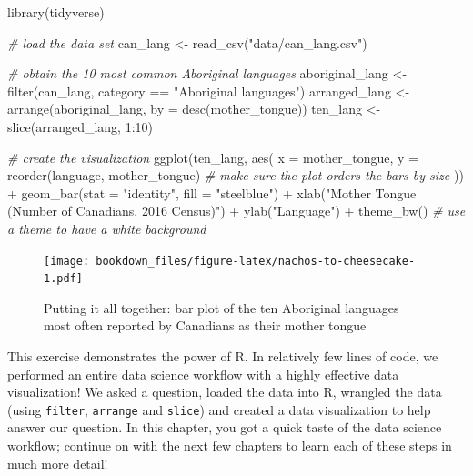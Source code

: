 \documentclass[
]{book}
\newenvironment{Shaded}{\begin{snugshade}}{\end{snugshade}}
\newcommand{\AttributeTok}[1]{\textcolor[rgb]{0.61,0.61,0.61}{#1}}
\newcommand{\CommentTok}[1]{\textcolor[rgb]{0.37,0.37,0.37}{\textit{#1}}}
\newcommand{\DecValTok}[1]{\textcolor[rgb]{0.06,0.06,0.06}{#1}}
\newcommand{\FunctionTok}[1]{\textcolor[rgb]{0,0,0}{#1}}
\newcommand{\NormalTok}[1]{#1}
\newcommand{\OtherTok}[1]{\textcolor[rgb]{0.37,0.37,0.37}{#1}}
\newcommand{\SpecialCharTok}[1]{\textcolor[rgb]{0,0,0}{#1}}
\newcommand{\StringTok}[1]{\textcolor[rgb]{0.5,0.5,0.5}{#1}}
\begin{document}
\begin{Shaded}
\begin{Highlighting}[]
\FunctionTok{library}\NormalTok{(tidyverse)}

\CommentTok{\# load the data set}
\NormalTok{can\_lang }\OtherTok{\textless{}{-}} \FunctionTok{read\_csv}\NormalTok{(}\StringTok{"data/can\_lang.csv"}\NormalTok{)}

\CommentTok{\# obtain the 10 most common Aboriginal languages}
\NormalTok{aboriginal\_lang }\OtherTok{\textless{}{-}} \FunctionTok{filter}\NormalTok{(can\_lang, category }\SpecialCharTok{==} \StringTok{"Aboriginal languages"}\NormalTok{)}
\NormalTok{arranged\_lang }\OtherTok{\textless{}{-}} \FunctionTok{arrange}\NormalTok{(aboriginal\_lang, }\AttributeTok{by =} \FunctionTok{desc}\NormalTok{(mother\_tongue))}
\NormalTok{ten\_lang }\OtherTok{\textless{}{-}} \FunctionTok{slice}\NormalTok{(arranged\_lang, }\DecValTok{1}\SpecialCharTok{:}\DecValTok{10}\NormalTok{)}

\CommentTok{\# create the visualization}
\FunctionTok{ggplot}\NormalTok{(ten\_lang, }\FunctionTok{aes}\NormalTok{(}
  \AttributeTok{x =}\NormalTok{ mother\_tongue,}
  \AttributeTok{y =} \FunctionTok{reorder}\NormalTok{(language, mother\_tongue)  }\CommentTok{\# make sure the plot orders the bars by size}
\NormalTok{)) }\SpecialCharTok{+}
  \FunctionTok{geom\_bar}\NormalTok{(}\AttributeTok{stat =} \StringTok{"identity"}\NormalTok{, }\AttributeTok{fill =} \StringTok{"steelblue"}\NormalTok{) }\SpecialCharTok{+}
  \FunctionTok{xlab}\NormalTok{(}\StringTok{"Mother Tongue (Number of Canadians, 2016 Census)"}\NormalTok{) }\SpecialCharTok{+}
  \FunctionTok{ylab}\NormalTok{(}\StringTok{"Language"}\NormalTok{) }\SpecialCharTok{+}
  \FunctionTok{theme\_bw}\NormalTok{() }\CommentTok{\# use a theme to have a white background}
\end{Highlighting}
\end{Shaded}

\begin{figure}
\centering
\texttt{[image: bookdown\_files/figure-latex/nachos-to-cheesecake-1.pdf]}
\caption{\label{fig:nachos-to-cheesecake}Putting it all together: bar plot of the ten Aboriginal languages most often reported by Canadians as their mother tongue}
\end{figure}

This exercise demonstrates the power of R. In relatively few lines of code, we
performed an entire data science workflow with a highly effective data
visualization! We asked a question, loaded the data into R, wrangled the data
(using \texttt{filter}, \texttt{arrange} and \texttt{slice}) and created a data visualization to
help answer our question. In this chapter, you got a quick taste of the data
science workflow; continue on with the next few chapters to learn each of
these steps in much more detail!
\end{document}
